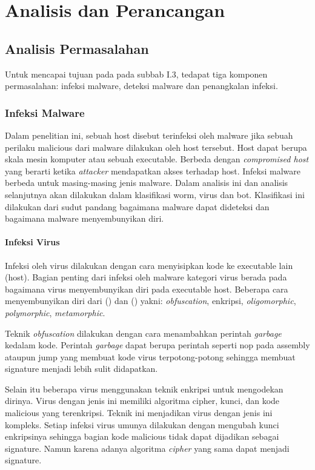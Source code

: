 \chapter{Analisis dan Perancangan}

\section{Analisis Permasalahan}
Untuk mencapai tujuan pada pada subbab I.3, tedapat tiga komponen permasalahan: infeksi malware, deteksi malware dan penangkalan infeksi.

\subsection{Infeksi Malware}
Dalam penelitian ini, sebuah host disebut terinfeksi oleh malware jika sebuah perilaku malicious dari malware dilakukan oleh host tersebut. Host dapat berupa skala mesin komputer atau sebuah executable. Berbeda dengan \textit{compromised host} yang berarti ketika \textit{attacker} mendapatkan akses terhadap host. Infeksi malware berbeda untuk masing-masing jenis malware. Dalam analisis ini dan analisis selanjutnya akan dilakukan dalam klasifikasi worm, virus dan bot. Klasifikasi ini dilakukan dari sudut pandang bagaimana malware dapat dideteksi dan bagaimana malware menyembunyikan diri.

\subsubsection{Infeksi Virus}

Infeksi oleh virus dilakukan dengan cara menyisipkan kode ke executable lain (host). Bagian penting dari infeksi oleh malware kategori virus berada pada bagaimana virus menyembunyikan diri pada executable host. Beberapa cara menyembunyikan diri dari (\cite{6620049}) dan (\cite{alsamer2016}) yakni: \textit{obfuscation}, enkripsi, \textit{oligomorphic}, \textit{polymorphic}, \textit{metamorphic}.

Teknik \textit{obfuscation} dilakukan dengan cara menambahkan perintah \textit{garbage} kedalam kode. Perintah \textit{garbage} dapat berupa perintah seperti nop pada assembly ataupun jump yang membuat kode virus terpotong-potong sehingga membuat signature menjadi lebih sulit didapatkan.

Selain itu beberapa virus menggunakan teknik enkripsi untuk mengodekan dirinya. Virus dengan jenis ini memiliki algoritma cipher, kunci, dan kode malicious yang terenkripsi. Teknik ini menjadikan virus dengan jenis ini kompleks. Setiap infeksi virus umunya dilakukan dengan mengubah kunci enkripsinya sehingga bagian kode malicious tidak dapat dijadikan sebagai signature. Namun karena adanya algoritma \textit{cipher} yang sama dapat menjadi signature.

